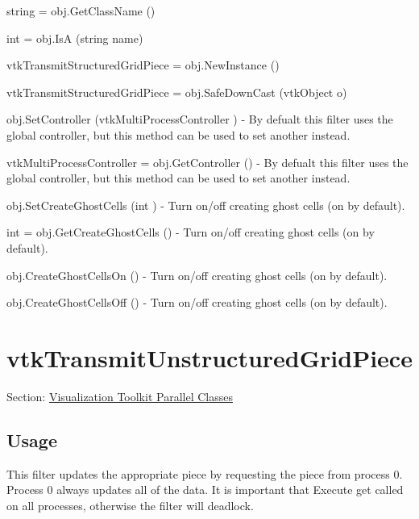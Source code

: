 \begin{DoxyItemize}
\item {\ttfamily string = obj.\-Get\-Class\-Name ()}  
\item {\ttfamily int = obj.\-Is\-A (string name)}  
\item {\ttfamily vtk\-Transmit\-Structured\-Grid\-Piece = obj.\-New\-Instance ()}  
\item {\ttfamily vtk\-Transmit\-Structured\-Grid\-Piece = obj.\-Safe\-Down\-Cast (vtk\-Object o)}  
\item {\ttfamily obj.\-Set\-Controller (vtk\-Multi\-Process\-Controller )} -\/ By defualt this filter uses the global controller, but this method can be used to set another instead.  
\item {\ttfamily vtk\-Multi\-Process\-Controller = obj.\-Get\-Controller ()} -\/ By defualt this filter uses the global controller, but this method can be used to set another instead.  
\item {\ttfamily obj.\-Set\-Create\-Ghost\-Cells (int )} -\/ Turn on/off creating ghost cells (on by default).  
\item {\ttfamily int = obj.\-Get\-Create\-Ghost\-Cells ()} -\/ Turn on/off creating ghost cells (on by default).  
\item {\ttfamily obj.\-Create\-Ghost\-Cells\-On ()} -\/ Turn on/off creating ghost cells (on by default).  
\item {\ttfamily obj.\-Create\-Ghost\-Cells\-Off ()} -\/ Turn on/off creating ghost cells (on by default).  
\end{DoxyItemize}\hypertarget{vtkparallel_vtktransmitunstructuredgridpiece}{}\section{vtk\-Transmit\-Unstructured\-Grid\-Piece}\label{vtkparallel_vtktransmitunstructuredgridpiece}
Section\-: \hyperlink{sec_vtkparallel}{Visualization Toolkit Parallel Classes} \hypertarget{vtkwidgets_vtkxyplotwidget_Usage}{}\subsection{Usage}\label{vtkwidgets_vtkxyplotwidget_Usage}
This filter updates the appropriate piece by requesting the piece from process 0. Process 0 always updates all of the data. It is important that Execute get called on all processes, otherwise the filter will deadlock.

